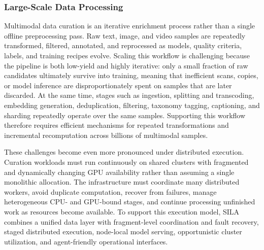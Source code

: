 \documentclass{llmxive}
\begin{document}
\subsubsection{Large-Scale Data Processing}
Multimodal data curation is an iterative enrichment process rather than a single offline preprocessing pass. Raw text, image, and video samples are repeatedly transformed, filtered, annotated, and reprocessed as models, quality criteria, labels, and training recipes evolve. Scaling this workflow is challenging because the pipeline is both low-yield and highly iterative: only a small fraction of raw candidates ultimately survive into training, meaning that inefficient scans, copies, or model inference are disproportionately spent on samples that are later discarded. At the same time, stages such as ingestion, splitting and transcoding, embedding generation, deduplication, filtering, taxonomy tagging, captioning, and sharding repeatedly operate over the same samples. Supporting this workflow therefore requires efficient mechanisms for repeated transformations and incremental recomputation across billions of multimodal samples.

These challenges become even more pronounced under distributed execution. Curation workloads must run continuously on shared clusters with fragmented and dynamically changing GPU availability rather than assuming a single monolithic allocation. The infrastructure must coordinate many distributed workers, avoid duplicate computation, recover from failures, manage heterogeneous CPU- and GPU-bound stages, and continue processing unfinished work as resources become available. To support this execution model, SILA combines a unified data layer with fragment-level coordination and fault recovery, staged distributed execution, node-local model serving, opportunistic cluster utilization, and agent-friendly operational interfaces.
\end{document}
